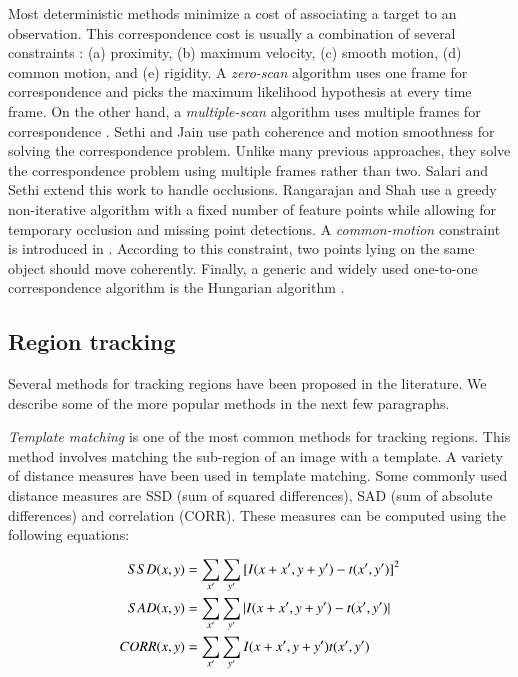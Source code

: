 \begin{Body}
Most deterministic methods minimize a cost of associating a target to an observation.  This correspondence cost is usually a combination of several constraints \cite{2006_JNL_SURVEYtrk_Yilmaz}: (a) proximity, (b) maximum velocity, (c) smooth motion, (d) common motion, and (e) rigidity.  A \emph{zero-scan} algorithm uses one frame for correspondence and picks the maximum likelihood hypothesis at every time frame.  On the other hand, a \emph{multiple-scan} algorithm uses multiple frames for correspondence \cite{1979_JNL_MTT_Reid}.    Sethi and Jain \cite{1987_JNL_FeatureTrajectories_Sethi} use path coherence and motion smoothness for solving the correspondence problem.  Unlike many previous approaches, they solve the correspondence problem using multiple frames rather than two.  Salari and Sethi \cite{1990_JNL_PointCorresp_Salari} extend this work to handle occlusions.  Rangarajan and Shah \cite{1991_JNL_MotionCorrespondence_Rangarajan} use a greedy non-iterative algorithm with a fixed number of feature points while allowing for temporary occlusion and missing point detections.  A \emph{common-motion} constraint is introduced in \cite{2001_JNL_MotionCorrespondence_Veenman}.  According to this constraint, two points lying on the same object should move coherently.  Finally, a generic and widely used one-to-one correspondence algorithm is the Hungarian algorithm \cite{1955_JNL_HungarianMethod_Kuhn}.

\subsection{Region tracking}
Several methods for tracking regions have been proposed in the literature.  We describe some of the more popular methods in the next few paragraphs.

\emph{Template matching} is one of the most common methods for tracking regions.  This method involves matching the sub-region of an image with a template.  A variety of distance measures have been used in template matching.  Some commonly used distance measures are SSD (sum of squared differences), SAD (sum of absolute differences) and correlation (CORR).  These measures can be computed using the following equations:


\begin{align}
SSD(x,y)  &=\sum_{x'}\sum_{y'} {[I(x+x', y+y')-t(x', y')]}^2 \notag\\
SAD(x,y)  &=\sum_{x'}\sum_{y'} |I(x+x', y+y')-t(x', y')| \\
CORR(x,y) &=\sum_{x'}\sum_{y'} I(x+x', y+y') t(x', y') \notag
\end{align}


\end{Body}
